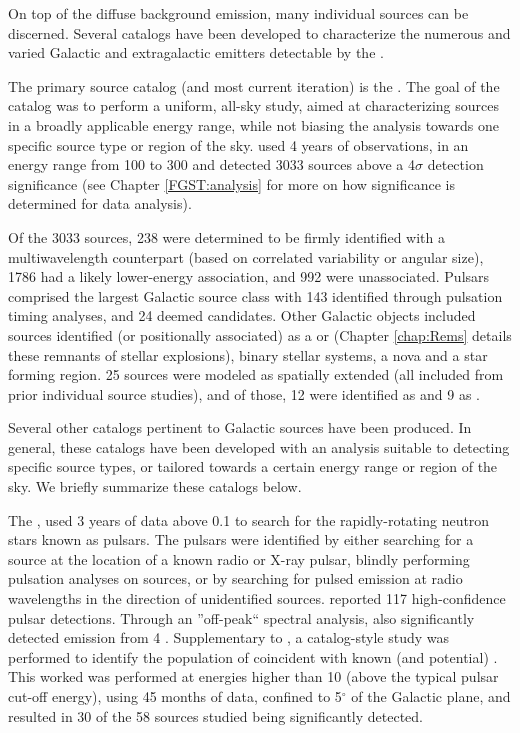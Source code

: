 On top of the diffuse background emission, many individual \gam{} sources can be discerned. Several catalogs have been developed to characterize the numerous and  varied Galactic and extragalactic \gam{} emitters detectable by the \lat{}. 

The primary \lat{} source catalog (and most current iteration) is the \threefgl{} \citep{3FGL}. The goal of the catalog was to perform a uniform, all-sky study, aimed at characterizing sources in a  broadly applicable energy range, while not biasing the analysis towards one specific source type or region of the sky. \threefgl{} used 4 years of observations, in an energy range from 100\mev{} to 300\gev{} and detected 3033 sources above a 4$\sigma$ detection significance (see Chapter \ref{FGST:analysis} for more on how significance is determined for \lat{} data analysis). 

Of the 3033 sources, 238 were determined to be firmly identified with a multiwavelength counterpart (based on correlated variability or angular size), 1786 had a likely lower-energy association, and 992 were unassociated. Pulsars comprised the largest Galactic source class with  143 identified through pulsation timing analyses, and 24 deemed candidates.  Other Galactic objects included sources identified (or positionally associated) as a \snr{} or \pwn{} (Chapter \ref{chap:Rems} details these remnants of stellar explosions), binary stellar systems, a nova and a star forming region.  25 sources were modeled as spatially extended (all included from prior individual source studies), and of those, 12 were identified as \snrs{} and 9 as \pwne{}.

Several other \lat{} catalogs pertinent to Galactic \gam{} sources have been produced. In general, these catalogs have been developed with an analysis suitable to detecting specific source types, or tailored towards a certain energy range or region of the sky. We briefly summarize these catalogs below.

The \twopc{}, \citep{2PC} used 3 years of \lat{} data above 0.1\gev{} to search for the rapidly-rotating neutron stars known as pulsars. The \gam{} pulsars were identified by either searching for a \gam{} source at the location of a known radio or X-ray pulsar, blindly performing pulsation analyses on \lat{} sources, or by searching for pulsed emission at radio wavelengths in the direction of unidentified \gam{}  sources. \twopc{} reported 117 high-confidence pulsar detections. Through an ''off-peak`` spectral analysis, \twopc{} also significantly detected emission from 4 \pwne{}. Supplementary to \twopc{}, a catalog-style study was performed to identify the population of \lat{} \pwne{}  coincident with known (and potential)\tev{} \pwne{} \citep{Acero13}. This worked was performed at energies higher than 10\gev{} (above the typical pulsar cut-off energy), using 45 months of \lat{} data, confined to 5$^\circ{}$ of the Galactic plane, and resulted in 30 of the 58 sources studied being significantly detected. 

